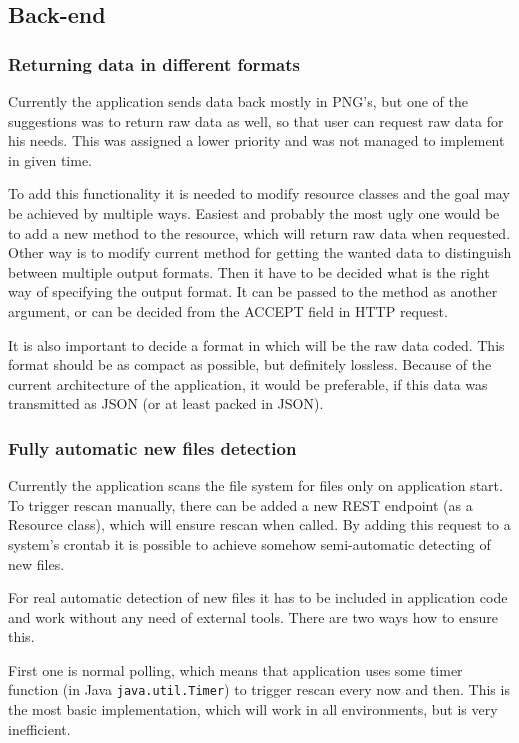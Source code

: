 \documentclass[11pt,a4paper,titlepage,oneside]{report}
\begin{document}

\subsection{Back-end}

\subsubsection{Returning data in different formats}
Currently the application sends data back mostly in \gls{PNG}'s, but one of the suggestions was to return raw data as well, so that user can request raw data for his needs. This was assigned a lower priority and was not managed to implement in given time.

To add this functionality it is needed to modify resource classes and the goal may be achieved by multiple ways. Easiest and probably the most ugly one would be to add a new method to the resource, which will return raw data when requested. Other way is to modify current method for getting the wanted data to distinguish between multiple output formats. Then it have to be decided what is the right way of specifying the output format. It can be passed to the method as another argument, or can be decided from the ACCEPT field in HTTP request.

It is also important to decide a format in which will be the raw data coded. This format should be as compact as possible, but definitely lossless. Because of the current architecture of the application, it would be preferable, if this data was transmitted as JSON (or at least packed in JSON).

\subsubsection{Fully automatic new files detection}
Currently the application scans the file system for files only on application start. To trigger rescan manually, there can be added a new REST endpoint (as a Resource class), which will ensure rescan when called. By adding this request to a system's crontab it is possible to achieve somehow semi-automatic detecting of new files.

For real automatic detection of new files it has to be included in application code and work without any need of external tools. There are two ways how to ensure this.

First one is normal polling, which means that application uses some timer function (in Java \texttt{java.util.Timer}) to trigger rescan every now and then. This is the most basic implementation, which will work in all environments, but is very inefficient.
\end{document}
